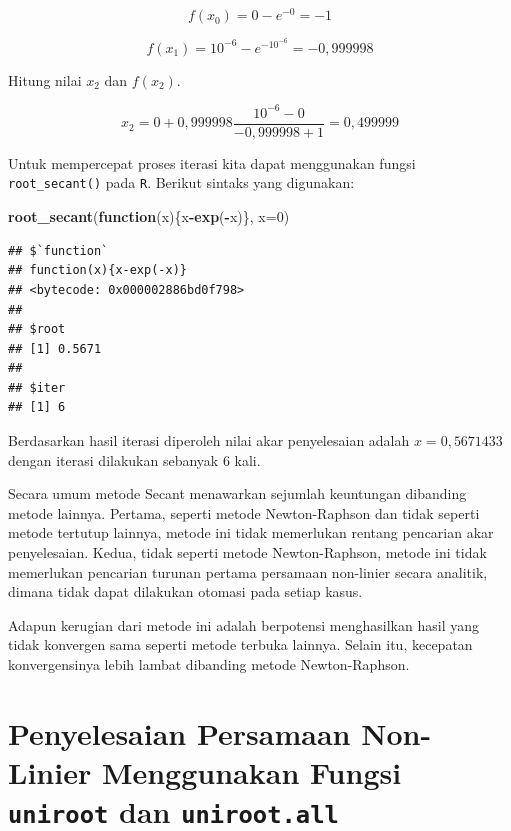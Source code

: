 \documentclass[
]{book}
\newenvironment{Shaded}{\begin{snugshade}}{\end{snugshade}}
\newcommand{\AttributeTok}[1]{\textcolor[rgb]{0.13,0.29,0.53}{#1}}
\newcommand{\ControlFlowTok}[1]{\textcolor[rgb]{0.13,0.29,0.53}{\textbf{#1}}}
\newcommand{\DecValTok}[1]{\textcolor[rgb]{0.00,0.00,0.81}{#1}}
\newcommand{\FunctionTok}[1]{\textcolor[rgb]{0.13,0.29,0.53}{\textbf{#1}}}
\newcommand{\NormalTok}[1]{#1}
\newcommand{\SpecialCharTok}[1]{\textcolor[rgb]{0.81,0.36,0.00}{\textbf{#1}}}
\theoremstyle{definition}
\theoremstyle{definition}
\theoremstyle{definition}
\theoremstyle{definition}
\theoremstyle{remark}
\begin{document}
\[
f\left(x_0 \right)=0-e^{-0}=-1
\]

\[
f\left(x_1 \right)=10^{-6}-e^{-10^{-6}}=-0,999998
\]

Hitung nilai \(x_2\) dan \(f\left(x_2 \right)\).

\[
x_2=0+0,999998\frac{10^{-6}-0}{-0,999998+1}=0,499999
\]

Untuk mempercepat proses iterasi kita dapat menggunakan fungsi \texttt{root\_secant()} pada \texttt{R}. Berikut sintaks yang digunakan:

\begin{Shaded}
\begin{Highlighting}[]
\FunctionTok{root\_secant}\NormalTok{(}\ControlFlowTok{function}\NormalTok{(x)\{x}\SpecialCharTok{{-}}\FunctionTok{exp}\NormalTok{(}\SpecialCharTok{{-}}\NormalTok{x)\}, }\AttributeTok{x=}\DecValTok{0}\NormalTok{)}
\end{Highlighting}
\end{Shaded}

\begin{verbatim}
## $`function`
## function(x){x-exp(-x)}
## <bytecode: 0x000002886bd0f798>
## 
## $root
## [1] 0.5671
## 
## $iter
## [1] 6
\end{verbatim}

Berdasarkan hasil iterasi diperoleh nilai akar penyelesaian adalah \(x=0,5671433\) dengan iterasi dilakukan sebanyak \(6\) kali.

Secara umum metode Secant menawarkan sejumlah keuntungan dibanding metode lainnya. Pertama, seperti metode Newton-Raphson dan tidak seperti metode tertutup lainnya, metode ini tidak memerlukan rentang pencarian akar penyelesaian. Kedua, tidak seperti metode Newton-Raphson, metode ini tidak memerlukan pencarian turunan pertama persamaan non-linier secara analitik, dimana tidak dapat dilakukan otomasi pada setiap kasus.

Adapun kerugian dari metode ini adalah berpotensi menghasilkan hasil yang tidak konvergen sama seperti metode terbuka lainnya. Selain itu, kecepatan konvergensinya lebih lambat dibanding metode Newton-Raphson.

\hypertarget{uniroot}{%
\section{\texorpdfstring{Penyelesaian Persamaan Non-Linier Menggunakan Fungsi \texttt{uniroot} dan \texttt{uniroot.all}}{Penyelesaian Persamaan Non-Linier Menggunakan Fungsi uniroot dan uniroot.all}}\label{uniroot}}
\end{document}

